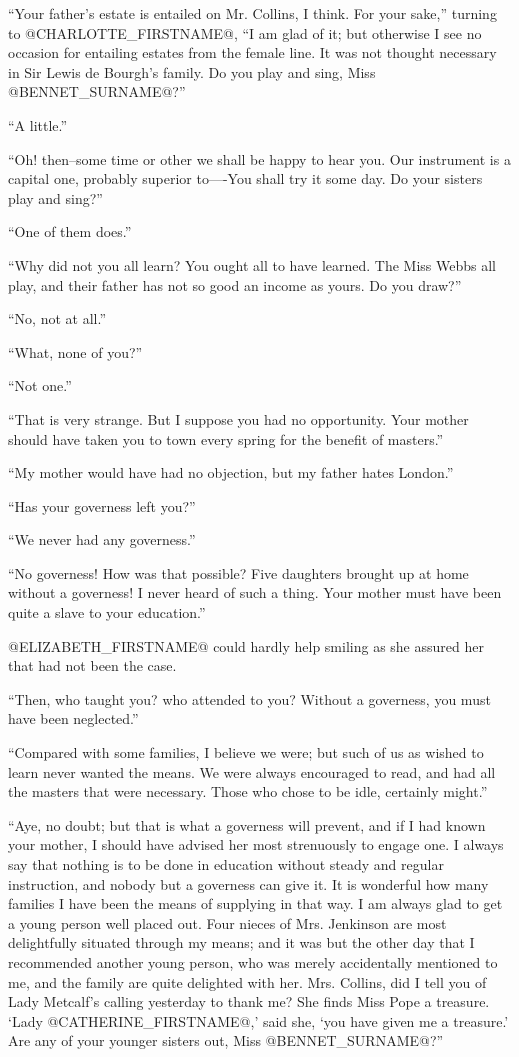 ``Your father's estate is entailed on Mr. Collins, I think. For your
sake,'' turning to @CHARLOTTE_FIRSTNAME@, ``I am glad of it; but otherwise I see no
occasion for entailing estates from the female line. It was not thought
necessary in Sir Lewis de Bourgh's family. Do you play and sing, Miss
@BENNET_SURNAME@?''

``A little.''

``Oh! then--some time or other we shall be happy to hear you. Our
instrument is a capital one, probably superior to----You shall try it
some day. Do your sisters play and sing?''

``One of them does.''

``Why did not you all learn? You ought all to have learned. The Miss
Webbs all play, and their father has not so good an income as yours. Do
you draw?''

``No, not at all.''

``What, none of you?''

``Not one.''

``That is very strange. But I suppose you had no opportunity. Your mother
should have taken you to town every spring for the benefit of masters.''

``My mother would have had no objection, but my father hates London.''

``Has your governess left you?''

``We never had any governess.''

``No governess! How was that possible? Five daughters brought up at home
without a governess! I never heard of such a thing. Your mother must
have been quite a slave to your education.''

@ELIZABETH_FIRSTNAME@ could hardly help smiling as she assured her that had not been
the case.

``Then, who taught you? who attended to you? Without a governess, you
must have been neglected.''

``Compared with some families, I believe we were; but such of us as
wished to learn never wanted the means. We were always encouraged to
read, and had all the masters that were necessary. Those who chose to be
idle, certainly might.''

``Aye, no doubt; but that is what a governess will prevent, and if I had
known your mother, I should have advised her most strenuously to engage
one. I always say that nothing is to be done in education without steady
and regular instruction, and nobody but a governess can give it. It is
wonderful how many families I have been the means of supplying in that
way. I am always glad to get a young person well placed out. Four nieces
of Mrs. Jenkinson are most delightfully situated through my means; and
it was but the other day that I recommended another young person,
who was merely accidentally mentioned to me, and the family are quite
delighted with her. Mrs. Collins, did I tell you of Lady Metcalf's
calling yesterday to thank me? She finds Miss Pope a treasure. `Lady
@CATHERINE_FIRSTNAME@,' said she, `you have given me a treasure.' Are any of your
younger sisters out, Miss @BENNET_SURNAME@?''

